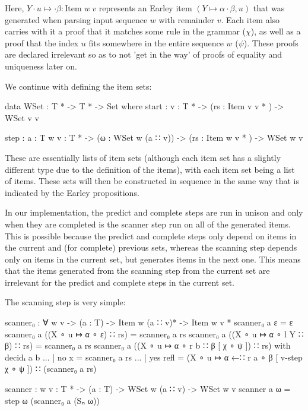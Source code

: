 		Here, $Y \cdot u \mapsto \cdot \beta : \textrm{Item } w\ v$ represents
		an Earley item $(Y \mapsto \alpha \cdot \beta , u)$ that was generated
		when parsing input sequence $w$ with remainder $v$. Each item also
		carries with it a proof that it matches some rule in the grammar
		($\chi$), as well as a proof that the index $u$ fits somewhere in the
		entire sequence $w$ ($\psi$). These proofs are declared irrelevant so
		as to not 'get in the way' of proofs of equality and uniqueness later
		on.

		We continue with defining the item sets:

		\begin{code}
			data WSet : T * -> T * -> Set where
			  start : {v : T *} ->
			    (rs : Item v v * ) ->
			    WSet v v

			  step : {a : T} {w v : T *} ->
			    (ω : WSet w (a ∷ v)) ->
			    (rs : Item w v * ) ->
			    WSet w v
		\end{code}

		These are essentially lists of item sets (although each item set has a
		slightly different type due to the definition of the items), with each
		item set being a list of items. These sets will then be constructed in
		sequence in the same way that is indicated by the Earley propositions.

		In our implementation, the predict and complete steps are run in unison
		and only when they are completed is the scanner step run on all of the
		generated items. This is possible because the predict and complete
		steps only depend on items in the current and (for complete) previous
		sets, whereas the scanning step depends only on items in the current
		set, but generates items in the next one. This means that the items
		generated from the scanning step from the current set are irrelevant
		for the predict and complete steps in the current set.

		The scanning step is very simple:

		\begin{code}
			scanner₀ : ∀ {w v} ->
			  (a : T) ->
			  Item w (a ∷ v)* ->
			  Item w v *
			scanner₀ a ε = ε
			scanner₀ a ((X ∘ u ↦ α ∘ ε) ∷ rs) = scanner₀ a rs
			scanner₀ a ((X ∘ u ↦ α ∘ l Y ∷ β) ∷ rs) = scanner₀ a rs
			scanner₀ a ((X ∘ u ↦ α ∘ r b ∷ β [ χ ∘ ψ ]) ∷ rs) with decidₜ a b
			... | no x = scanner₀ a rs
			... | yes refl =
			  (X ∘ u ↦ α ←∷ r a ∘ β [ v-step χ ∘ ψ ]) ∷ (scanner₀ a rs)

			scanner : {w v : T *} ->
			  (a : T) ->
			  WSet w (a ∷ v) ->
			  WSet w v
			scanner a ω = step ω (scanner₀ a (Sₙ ω))
		\end{code}

